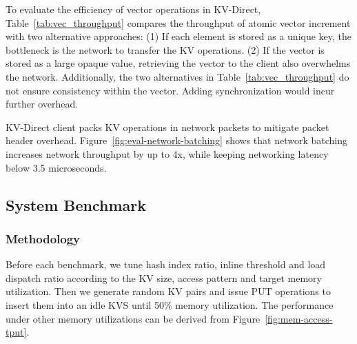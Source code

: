 To evaluate the efficiency of vector operations in KV-Direct, Table~\ref{tab:vec_throughput} compares the throughput of atomic vector increment with two alternative approaches:
(1) If each element is stored as a unique key, the bottleneck is the network to transfer the KV operations.
(2) If the vector is stored as a large opaque value, retrieving the vector to the client also overwhelms the network.
Additionally, the two alternatives in Table~\ref{tab:vec_throughput} do not ensure consistency within the vector. Adding synchronization would incur further overhead.

KV-Direct client packs KV operations in network packets to mitigate packet header overhead.
Figure~\ref{fig:eval-network-batching} shows that network batching increases network throughput by up to 4x, while keeping networking latency below 3.5 microseconds.


\subsection{System Benchmark}
\label{sec:system-benchmark}

\subsubsection{Methodology}

Before each benchmark, we tune hash index ratio, inline threshold and load dispatch ratio according to the KV size, access pattern and target memory utilization.
Then we generate random KV pairs and issue PUT operations to insert them into an idle KVS until 50\% memory utilization.
The performance under other memory utilizations can be derived from Figure~\ref{fig:mem-access-tput}.

